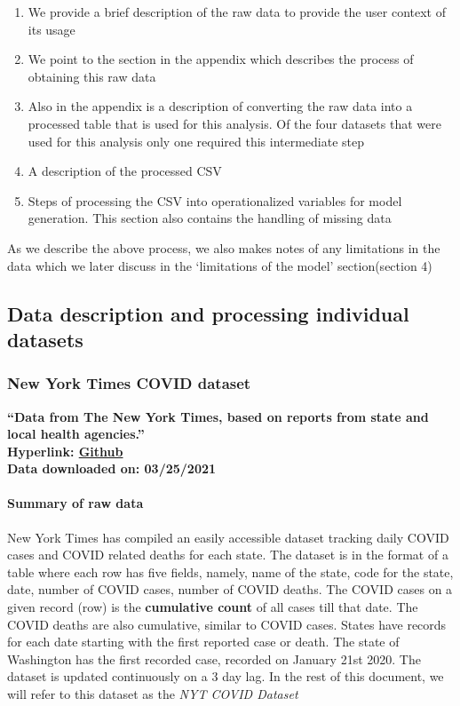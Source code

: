 \documentclass[
]{article}
\providecommand{\tightlist}{%
  \setlength{\itemsep}{0pt}\setlength{\parskip}{0pt}}
\begin{document}
\begin{enumerate}
\def\labelenumi{\arabic{enumi}.}
\tightlist
\item
  We provide a brief description of the raw data to provide the user
  context of its usage
\item
  We point to the section in the appendix which describes the process of
  obtaining this raw data
\item
  Also in the appendix is a description of converting the raw data into
  a processed table that is used for this analysis. Of the four datasets
  that were used for this analysis only one required this intermediate
  step
\item
  A description of the processed CSV
\item
  Steps of processing the CSV into operationalized variables for model
  generation. This section also contains the handling of missing data
\end{enumerate}

As we describe the above process, we also makes notes of any limitations
in the data which we later discuss in the `limitations of the model'
section(section 4)

\newpage

\subsection{Data description and processing individual datasets}

\hypertarget{new-york-times-covid-dataset}{%
\subsubsection{New York Times COVID
dataset}\label{new-york-times-covid-dataset}}

\textbf{``Data from The New York Times, based on reports from state and
local health agencies.'' }\\
\textbf{Hyperlink:
\href{https://github.com/nytimes/covid-19-data}{Github}}\\
\textbf{Data downloaded on: 03/25/2021 }

\hypertarget{summary-of-raw-data}{%
\paragraph{\texorpdfstring{Summary of raw data\\
}{Summary of raw data }}\label{summary-of-raw-data}}

New York Times has compiled an easily accessible dataset tracking daily
COVID cases and COVID related deaths for each state. The dataset is in
the format of a table where each row has five fields, namely, name of
the state, code for the state, date, number of COVID cases, number of
COVID deaths. The COVID cases on a given record (row) is the
\textbf{cumulative count} of all cases till that date. The COVID deaths
are also cumulative, similar to COVID cases. States have records for
each date starting with the first reported case or death. The state of
Washington has the first recorded case, recorded on January 21st 2020.
The dataset is updated continuously on a 3 day lag. In the rest of this
document, we will refer to this dataset as the \emph{NYT COVID Dataset}
\end{document}
